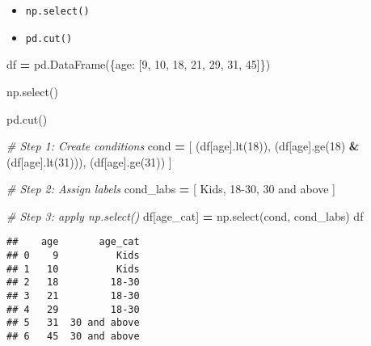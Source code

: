 \documentclass[
]{book}
\newenvironment{Shaded}{\begin{snugshade}}{\end{snugshade}}
\newcommand{\CommentTok}[1]{\textcolor[rgb]{0.56,0.35,0.01}{\textit{#1}}}
\newcommand{\DecValTok}[1]{\textcolor[rgb]{0.00,0.00,0.81}{#1}}
\newcommand{\NormalTok}[1]{#1}
\newcommand{\OperatorTok}[1]{\textcolor[rgb]{0.81,0.36,0.00}{\textbf{#1}}}
\newcommand{\StringTok}[1]{\textcolor[rgb]{0.31,0.60,0.02}{#1}}
\begin{document}
\begin{itemize}
\item
  \texttt{np.select()}
\item
  \texttt{pd.cut()}
\end{itemize}

\begin{Shaded}
\begin{Highlighting}[]
\NormalTok{df }\OperatorTok{=}\NormalTok{ pd.DataFrame(\{}\StringTok{\textquotesingle{}age\textquotesingle{}}\NormalTok{: [}\DecValTok{9}\NormalTok{, }\DecValTok{10}\NormalTok{, }\DecValTok{18}\NormalTok{, }\DecValTok{21}\NormalTok{, }\DecValTok{29}\NormalTok{, }\DecValTok{31}\NormalTok{, }\DecValTok{45}\NormalTok{]\})}
\end{Highlighting}
\end{Shaded}

np.select()

pd.cut()

\begin{Shaded}
\begin{Highlighting}[]
\CommentTok{\# Step 1: Create conditions}
\NormalTok{cond }\OperatorTok{=}\NormalTok{ [}
\NormalTok{  (df[}\StringTok{\textquotesingle{}age\textquotesingle{}}\NormalTok{].lt(}\DecValTok{18}\NormalTok{)),}
\NormalTok{  (df[}\StringTok{\textquotesingle{}age\textquotesingle{}}\NormalTok{].ge(}\DecValTok{18}\NormalTok{) }\OperatorTok{\&}\NormalTok{ (df[}\StringTok{\textquotesingle{}age\textquotesingle{}}\NormalTok{].lt(}\DecValTok{31}\NormalTok{))),}
\NormalTok{  (df[}\StringTok{\textquotesingle{}age\textquotesingle{}}\NormalTok{].ge(}\DecValTok{31}\NormalTok{))}
\NormalTok{]}

\CommentTok{\# Step 2: Assign labels}
\NormalTok{cond\_labs }\OperatorTok{=}\NormalTok{ [}
  \StringTok{\textquotesingle{}Kids\textquotesingle{}}\NormalTok{, }\StringTok{\textquotesingle{}18{-}30\textquotesingle{}}\NormalTok{, }\StringTok{\textquotesingle{}30 and above\textquotesingle{}}
\NormalTok{]}

\CommentTok{\# Step 3: apply np.select()}
\NormalTok{df[}\StringTok{\textquotesingle{}age\_cat\textquotesingle{}}\NormalTok{] }\OperatorTok{=}\NormalTok{ np.select(cond, cond\_labs)}
\NormalTok{df}
\end{Highlighting}
\end{Shaded}

\begin{verbatim}
##    age       age_cat
## 0    9          Kids
## 1   10          Kids
## 2   18         18-30
## 3   21         18-30
## 4   29         18-30
## 5   31  30 and above
## 6   45  30 and above
\end{verbatim}
\end{document}

